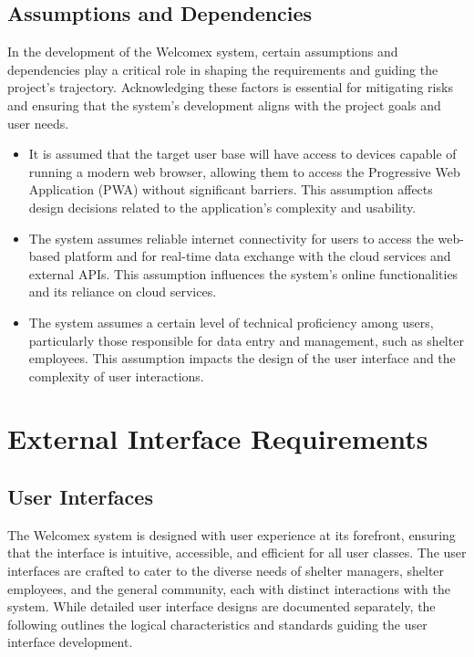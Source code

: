 \documentclass{scrreprt}
\begin{document}
\section{Assumptions and Dependencies}
In the development of the Welcomex system, certain assumptions and dependencies play a critical role in shaping the requirements and guiding the project's trajectory. Acknowledging these factors is essential for mitigating risks and ensuring that the system's development aligns with the project goals and user needs.

\begin{itemize}
    \item It is assumed that the target user base will have access to devices capable of running a modern web browser, allowing them to access the Progressive Web Application (PWA) without significant barriers. This assumption affects design decisions related to the application's complexity and usability.
    \item The system assumes reliable internet connectivity for users to access the web-based platform and for real-time data exchange with the cloud services and external APIs. This assumption influences the system's online functionalities and its reliance on cloud services.
    \item The system assumes a certain level of technical proficiency among users, particularly those responsible for data entry and management, such as shelter employees. This assumption impacts the design of the user interface and the complexity of user interactions.
\end{itemize}

\chapter{External Interface Requirements}
\section{User Interfaces}
The Welcomex system is designed with user experience at its forefront, ensuring that the interface is intuitive, accessible, and efficient for all user classes. The user interfaces are crafted to cater to the diverse needs of shelter managers, shelter employees, and the general community, each with distinct interactions with the system. While detailed user interface designs are documented separately, the following outlines the logical characteristics and standards guiding the user interface development.
\end{document}
